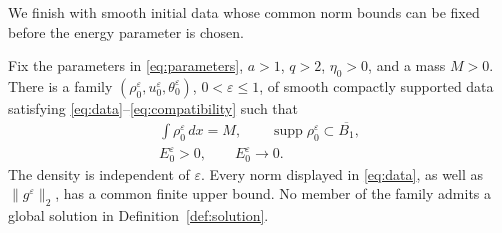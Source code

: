 \documentclass[10pt,twoside]{article}
\newcommand{\dd}{\,dx}
\newcommand{\supp}{\operatorname{supp}}
\newcommand{\norm}[2]{\lVert#1\rVert_{#2}}
\begin{document}
We finish with smooth initial data whose common norm bounds can be
fixed before the energy parameter is chosen.

\begin{corollary}\label{cor:smallenergy}
Fix the parameters in \eqref{eq:parameters}, $a>1$, $q>2$,
$\eta_0>0$, and a mass $M>0$. There is a family
$(\rho_0^\varepsilon,u_0^\varepsilon,\theta_0^\varepsilon)$,
$0<\varepsilon\le1$, of smooth compactly supported data satisfying
\eqref{eq:data}--\eqref{eq:compatibility} such that
\begin{equation}
 \begin{gathered}
 \int\rho_0^\varepsilon\dd=M,\qquad
 \supp\rho_0^\varepsilon\subset\overline{B_1},\\
 E_0^\varepsilon>0,\qquad E_0^\varepsilon\longrightarrow0.
 \end{gathered}
 \label{eq:familyproperties}
\end{equation}
The density is independent of $\varepsilon$. Every norm displayed
in \eqref{eq:data}, as well as $\norm{g^\varepsilon}{2}$, has a
common finite upper bound. No member of the family admits a global
solution in Definition~\ref{def:solution}.
\end{corollary}
\end{document}
